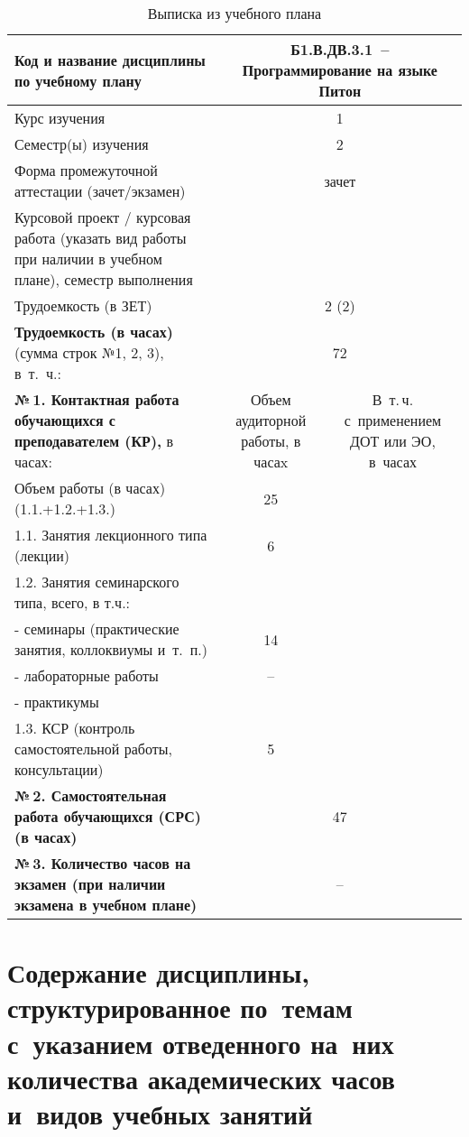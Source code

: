 \documentclass[a4paper,12pt]{article}
\begin{document}
\begin{table}[H]
\caption{Выписка из учебного плана} 
\begin{tabular}{|p{9cm}|c|c|}
\hline
Код и название дисциплины по учебному плану & \multicolumn{2}{p{6cm}|}{Б1.В.ДВ.3.1\ -- Программирование на языке Питон }\\
\hline
Курс изучения &\multicolumn{2}{c|}{ 1 }\\
\hline
Семестр(ы) изучения &\multicolumn{2}{c|}{ 2 }\\
\hline
Форма промежуточной аттестации (зачет/экзамен) &\multicolumn{2}{c|}{ зачет }\\
\hline
Курсовой проект / курсовая работа (указать вид работы при наличии в учебном плане), семестр выполнения &\multicolumn{2}{c|}{ }\\
\hline
Трудоемкость (в ЗЕТ) &\multicolumn{2}{c|}{ 2 (2) }\\
\hline
{\bf Трудоемкость (в часах)} (сумма строк №1, 2, 3), в~т.~ч.:& \multicolumn{2}{c|}{72}\\
\hline
\textbf{№\,1. Контактная работа обучающихся с преподавателем (КР),} в часах:
& \multicolumn{1}{p{3cm}|}{\centering Объем аудиторной работы, в часаx}
& \multicolumn{1}{p{3cm}|}{\centering\arraybackslash В~т.\,ч. с~применением ДОТ или ЭО, в~часах}\\
\hline  
Объем работы (в часах) (1.1.+1.2.+1.3.)& 25 & \\
\hline
1.1. Занятия лекционного типа (лекции) & 6 & \\
\hline
1.2. Занятия семинарского типа, всего, в т.ч.: & & \\
\hline
- семинары (практические занятия, коллоквиумы и~т.~п.)  & 14 & \\
\hline
- лабораторные работы& – & \\
\hline
- практикумы & & \\
\hline
1.3. КСР (контроль самостоятельной работы, консультации)& 5 & \\
\hline
{\bf №\,2. Самостоятельная работа обучающихся (СРС) (в часах)}& \multicolumn{2}{c|}{47}\\
\hline
{\bf №\,3. Количество часов на экзамен (при наличии экзамена в учебном плане)}& \multicolumn{2}{c|}{–}\\
\hline
\end{tabular}
\end{table}



\newpage
\section{Содержание дисциплины, структурированное по~темам с~указанием отведенного на~них количества академических часов и~видов учебных занятий}
\end{document}
